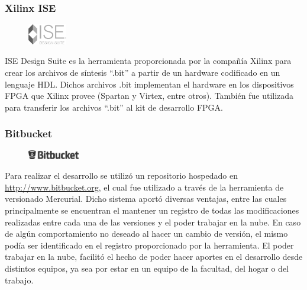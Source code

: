 \subsubsection*{Xilinx ISE}
\begin{figure}
	\vspace{-15pt}
	\begin{center}
		\includegraphics[width=0.15\textwidth]{./figures/C04-logo_ise}
	\end{center}
	\vspace{-15pt}
\end{figure}
ISE Design Suite es la herramienta proporcionada por la compañía Xilinx para crear los archivos de síntesis ``.bit'' a partir de un hardware codificado en un lenguaje HDL. Dichos archivos .bit implementan el hardware en los dispositivos FPGA que Xilinx provee (Spartan y Virtex, entre otros). También fue utilizada para transferir los archivos ``.bit'' al kit de desarrollo FPGA.

\subsubsection*{Bitbucket}
\begin{figure}
	\vspace{-15pt}
	\begin{center}
		\includegraphics[width=0.20\textwidth]{./figures/C04-logo_bitbucket}
	\end{center}
	\vspace{-15pt}
\end{figure}
Para realizar el desarrollo se utilizó un repositorio hospedado en \href{http://www.bitbucket.org}{http://www.bitbucket.org}, el cual fue utilizado a través de la herramienta de versionado Mercurial. Dicho sistema aportó diversas ventajas, entre las cuales principalmente se encuentran el mantener un registro de todas las modificaciones realizadas entre cada una de las versiones y el poder trabajar en la nube. En caso de algún comportamiento no deseado al hacer un cambio de versión, el mismo podía ser identificado en el registro proporcionado por la herramienta. El poder trabajar en la nube, facilitó el hecho de poder hacer aportes en el desarrollo desde distintos equipos, ya sea por estar en un equipo de la facultad, del hogar o del trabajo.